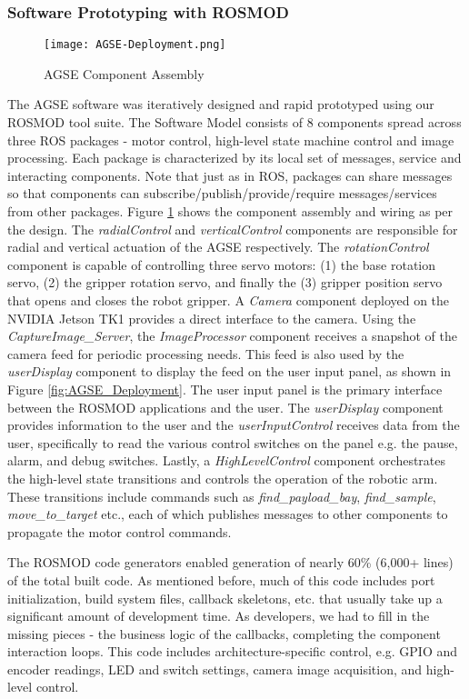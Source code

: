 \subsubsection{Software Prototyping with ROSMOD}

\begin{figure}[h]
	\centering
	\texttt{[image: AGSE-Deployment.png]}
	\caption{AGSE Component Assembly}
	\label{fig:AGSE}
\end{figure}
\FloatBarrier

The AGSE software was iteratively designed and rapid prototyped using
our ROSMOD tool suite. The Software Model consists of 8 components
spread across three ROS packages - motor control, high-level state
machine control and image processing. Each package is characterized by
its local set of messages, service and interacting components. Note
that just as in ROS, packages can share messages so that components
can subscribe/publish/provide/require messages/services from other
packages. Figure \ref{fig:AGSE} shows the component assembly and
wiring as per the design. The \emph{radialControl} and
\emph{verticalControl} components are responsible for radial and
vertical actuation of the AGSE respectively. The
\emph{rotationControl} component is capable of controlling three servo
motors: (1) the base rotation servo, (2) the gripper rotation servo,
and finally the (3) gripper position servo that opens and closes the
robot gripper. A \emph{Camera} component deployed on the NVIDIA Jetson
TK1 provides a direct interface to the camera. Using the
\emph{CaptureImage\_Server}, the \emph{ImageProcessor} component
receives a snapshot of the camera feed for periodic processing
needs. This feed is also used by the \emph{userDisplay} component to
display the feed on the user input panel, as shown in Figure
\ref{fig:AGSE_Deployment}. The user input panel is the primary
interface between the ROSMOD applications and the user. The
\emph{userDisplay} component provides information to the user and the
\emph{userInputControl} receives data from the user, specifically to
read the various control switches on the panel e.g. the pause, alarm,
and debug switches. Lastly, a \emph{HighLevelControl} component
orchestrates the high-level state transitions and controls the
operation of the robotic arm. These transitions include commands such
as \emph{find\_payload\_bay}, \emph{find\_sample},
\emph{move\_to\_target} etc., each of which publishes messages to
other components to propagate the motor control commands.

The ROSMOD code generators enabled generation of nearly 60\% (6,000+
lines) of the total built code. As mentioned before, much of this code
includes port initialization, build system files, callback skeletons,
etc. that usually take up a significant amount of development time. As
developers, we had to fill in the missing pieces - the business logic
of the callbacks, completing the component interaction loops. This
code includes architecture-specific control, e.g. GPIO and encoder
readings, LED and switch settings, camera image acquisition, and
high-level control.

